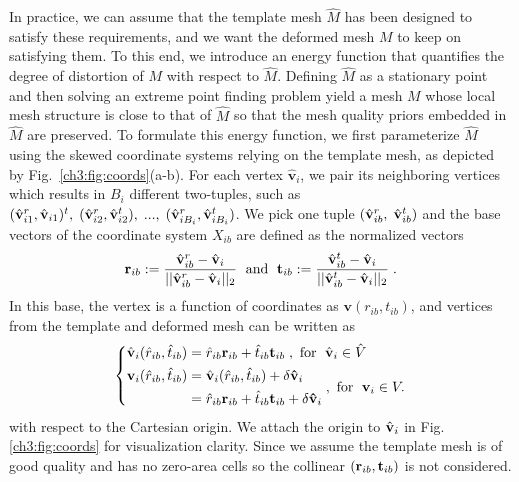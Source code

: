 In practice, we can assume that the template mesh $\hat{M}$ has been designed to satisfy these requirements, and we want the deformed mesh $M$ to keep on satisfying them. To this end, we introduce an energy function that quantifies the degree of distortion of $M$ with respect to $\hat{M}$. Defining $\hat{M}$ as a stationary point and then solving an extreme point finding problem yield a mesh $M$ whose local mesh structure is close to that of $\hat{M}$ so that the mesh quality priors embedded in $\hat{M}$ are preserved. To formulate this energy function, we first parameterize $\hat{M}$ using the skewed coordinate systems relying on the template mesh, as depicted by  Fig.~\ref{ch3:fig:coords}(a-b).  For each vertex $\mathbf{\hat{v}}_i$, we pair its neighboring  vertices which results in $B_i$ different two-tuples, such as $(\hat{\mathbf{v}}_{i1}^r, \hat{\mathbf{v}}_{i1})^t, \; (\hat{\mathbf{v}}_{i2}^r, \hat{\mathbf{v}}_{i2}^t), \;..., \; (\hat{\mathbf{v}}_{iB_i}^r, \hat{\mathbf{v}}_{iB_i}^t)$.
We pick one tuple $(\hat{\mathbf{v}}_{ib}^r, \; \hat{\mathbf{v}}_{ib}^t)$ and the base vectors of the coordinate system $X_{ib}$ are defined as the normalized vectors 
%
\begin{equation}
  \mathbf{r}_{ib} := \frac{{{\hat{\mathbf{v}}_{ib}^r} - {\hat{\mathbf{v}}_i}}}{{||{\hat{\mathbf{v}}_{ib}^r} - {\hat{\mathbf{v}}_i}||_2}} \; \text{ and }\; \mathbf{t}_{ib} := \frac{{{\hat{\mathbf{v}}_{ib}^t} - {\hat{\mathbf{v}}_i}}}{{||{\hat{\mathbf{v}}_{ib}^t} - {\hat{\mathbf{v}}_i}||_2}} \; .
\label{ch3:eq:new_base}
\end{equation}
%
In this base, the vertex is a function of coordinates as $\mathbf{v}(r_{ib},t_{ib})$, and vertices from the template and deformed mesh can be written as
\begin{equation}
    \left\{ 
      \begin{aligned}
          &\hat{\mathbf{v}}_i(\hat{r}_{ib}, \hat{t}_{ib})= \hat{r}_{ib}\mathbf{r}_{ib}+\hat{t}_{ib}\mathbf{t}_{ib} \;, \text{ for } \;  \hat{\mathbf{v}}_i \in \hat{V}  \\
          &\begin{aligned}
              \mathbf{v}_i(\hat{r}_{ib}, \hat{t}_{ib}) & = \hat{\mathbf{v}}_i(\hat{r}_{ib}, \hat{t}_{ib}) + \mathbf{\delta\hat{v}}_i \\
              & =  \hat{r}_{ib}\mathbf{r}_{ib}+\hat{t}_{ib}\mathbf{t}_{ib} + \mathbf{\delta\hat{v}}_i
          \end{aligned} 
          \;, \text{ for } \;  {\mathbf{v}}_i \in V .
      \end{aligned}
    \right.
\label{ch3:eq:coords_new_base}
\end{equation}
with respect to the Cartesian origin. We attach the origin to $\hat{\mathbf{v}}_i$ in Fig.\ref{ch3:fig:coords} for visualization clarity. Since we assume the template mesh is of good quality and has no zero-area cells so the collinear $(\mathbf{r}_{ib},\mathbf{t}_{ib})$ is not considered.
